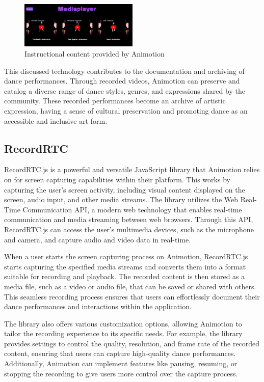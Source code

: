 \begin{figure}[htb]
  \centering
  \includegraphics[width=0.5\textwidth]{pics/exampleVids.png}
  \caption{Instructional content provided by Animotion}
  \label{fig:examplevids}
\end{figure}

This discussed technology contributes to the documentation and archiving of dance performances. Through recorded videos, Animotion can preserve and 
catalog a diverse range of dance styles, genres, and expressions shared by the community. These recorded performances become an archive of artistic expression, 
having a sense of cultural preservation and promoting dance as an accessible and inclusive art form.

\subsection{RecordRTC}
RecordRTC.js is a powerful and versatile JavaScript library that Animotion relies on for screen capturing capabilities within their platform.
This works by capturing the user's screen activity, including visual content displayed on the screen, audio input, 
and other media streams. The library utilizes the Web Real-Time Communication API, a modern web technology that enables real-time 
communication and media streaming between web browsers. Through this API, RecordRTC.js can access the user's multimedia devices, 
such as the microphone and camera, and capture audio and video data in real-time. \cite{rtcrecord}

When a user starts the screen capturing process on Animotion, RecordRTC.js starts capturing the specified media 
streams and converts them into a format suitable for recording and playback. The recorded content is then stored as a media file, 
such as a video or audio file, that can be saved or shared with others. This seamless recording process ensures that users can 
effortlessly document their dance performances and interactions within the application.

The library also offers various customization options, allowing Animotion to tailor the recording experience to its specific needs. 
For example, the library provides settings to control the quality, resolution, and frame rate of the recorded content, ensuring that 
users can capture high-quality dance performances. Additionally, Animotion can implement features like pausing, resuming, or 
stopping the recording to give users more control over the capture process. \cite{rtcrecord2}

